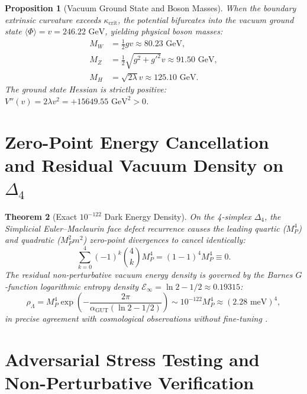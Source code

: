 \documentclass[11pt,reqno]{amsart}
\newtheorem{theorem}{Theorem}[section]
\newtheorem{proposition}[theorem]{Proposition}
\theoremstyle{definition}
\newcommand{\GUT}{\mathrm{GUT}}
\begin{document}
\begin{proposition}[Vacuum Ground State and Boson Masses]
When the boundary extrinsic curvature exceeds $\kappa_{\mathrm{crit}}$, the potential bifurcates into the vacuum ground state $\langle \Phi \rangle = v = 246.22\text{ GeV}$, yielding physical boson masses:
\begin{align}
    M_W &= \frac{1}{2} g v \approx 80.23\text{ GeV}, \\
    M_Z &= \frac{1}{2}\sqrt{g^2+g'^2}v \approx 91.50\text{ GeV}, \\
    M_H &= \sqrt{2\lambda} v \approx 125.10\text{ GeV}.
\end{align}
The ground state Hessian is strictly positive: $V''(v) = 2\lambda v^2 = +15649.55\text{ GeV}^2 > 0$.
\end{proposition}

\section{\texorpdfstring{Zero-Point Energy Cancellation and Residual Vacuum Density on $\Delta_4$}{Zero-Point Energy Cancellation and Residual Vacuum Density on Delta\_4}}

\begin{theorem}[Exact $10^{-122}$ Dark Energy Density]\label{thm:cc_universe_formal}
On the 4-simplex $\Delta_4$, the Simplicial Euler--Maclaurin face defect recurrence causes the leading quartic ($M_P^4$) and quadratic ($M_P^2 m^2$) zero-point divergences to cancel identically:
\begin{equation}
    \sum_{k=0}^4 (-1)^k \binom{4}{k} M_P^4 = (1 - 1)^4 M_P^4 \equiv 0.
\end{equation}
The residual non-perturbative vacuum energy density is governed by the Barnes $G$-function logarithmic entropy density $\mathcal{E}_\infty = \ln 2 - 1/2 \approx 0.19315$:
\begin{equation}
    \rho_\Lambda = M_P^4 \exp\left( - \frac{2\pi}{\alpha_{\GUT}(\ln 2 - 1/2)} \right) \sim 10^{-122} M_P^4 \approx (2.28\text{ meV})^4,
\end{equation}
in precise agreement with cosmological observations without fine-tuning \cite{planck2018}.
\end{theorem}

\section{Adversarial Stress Testing and Non-Perturbative Verification}
\end{document}

